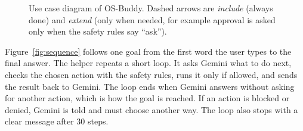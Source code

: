 \documentclass[11pt,a4paper]{article}
\newcommand{\projectname}{OS-Buddy}
\begin{document}
\begin{figure}[!t]
{}
\caption{Use case diagram of \projectname. Dashed arrows are \emph{include} (always done)
  and \emph{extend} (only when needed, for example approval is asked only when the safety rules
  say ``ask'').}
\label{fig:usecase}
\end{figure}

Figure~\ref{fig:sequence} follows one goal from the first word the user types to the final answer.
The helper repeats a short loop. It asks Gemini what to do next, checks the chosen action with the
safety rules, runs it only if allowed, and sends the result back to Gemini. The loop ends when Gemini
answers without asking for another action, which is how the goal is reached. If an action is blocked
or denied, Gemini is told and must choose another way. The loop also stops with a clear message
after 30 steps.
\end{document}
